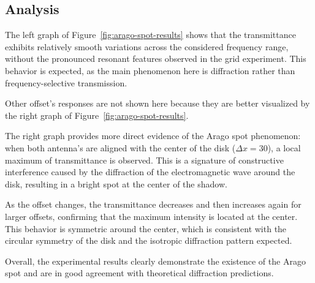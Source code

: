 \documentclass{article}
\begin{document}
\subsection{Analysis}

The left graph of Figure~\ref{fig:arago-spot-results} shows that the transmittance exhibits relatively smooth variations across the considered frequency range, without the pronounced resonant features observed in the grid experiment. This behavior is expected, as the main phenomenon here is diffraction rather than frequency-selective transmission.

Other offset's responses are not shown here because they are better visualized by the right graph of Figure~\ref{fig:arago-spot-results}.

The right graph provides more direct evidence of the Arago spot phenomenon: when both antenna's are aligned with the center of the disk (\( \Delta x = 30 \)), a local maximum of transmittance is observed. This is a signature of constructive interference caused by the diffraction of the electromagnetic wave around the disk, resulting in a bright spot at the center of the shadow.

As the offset changes, the transmittance decreases and then increases again for larger offsets, confirming that the maximum intensity is located at the center. This behavior is symmetric around the center, which is consistent with the circular symmetry of the disk and the isotropic diffraction pattern expected.

Overall, the experimental results clearly demonstrate the existence of the Arago spot and are in good agreement with theoretical diffraction predictions.



\end{document}
